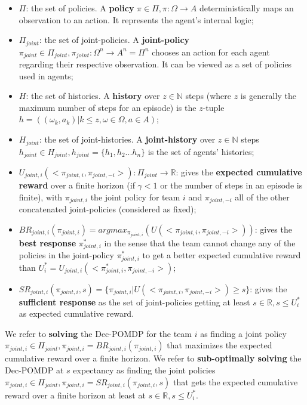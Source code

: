 \documentclass[sn-mathphys-num]{sn-jnl}%
\theoremstyle{thmstyleone}%
\theoremstyle{thmstyletwo}%
\theoremstyle{thmstylethree}%
\begin{document}
\begin{itemize}

    \item $\Pi$: the set of policies. A \textbf{policy} $\pi \in \Pi, \pi: \Omega \rightarrow A$ deterministically maps an observation to an action. It represents the agent's internal logic;
    \item $\Pi_{joint}$: the set of joint-policies. A \textbf{joint-policy} $\pi_{joint} \in \Pi_{joint}, \pi_{joint}: \Omega^n \rightarrow A^n = \Pi^n$ chooses an action for each agent regarding their respective observation. It can be viewed as a set of policies used in agents;
    \item $H$: the set of histories. A \textbf{history} over $z \in \mathbb{N}$ steps (where $z$ is generally the maximum number of steps for an episode) is the $z$-tuple $h = ((\omega_{k}, a_{k}) | k \leq z, \omega \in \Omega, a \in A)$;
    \item $H_{joint}$: the set of joint-histories. A \textbf{joint-history} over $z \in \mathbb{N}$ steps $h_{joint} \in H_{joint}, h_{joint} = \{h_1,h_2...h_n\}$ is the set of agents' histories;
    \item $U_{joint,i}(<\pi_{joint,i}, \pi_{joint,-i}>): \Pi_{joint} \rightarrow \mathbb{R}$: gives the \textbf{expected cumulative reward} over a finite horizon (if $\gamma < 1$ or the number of steps in an episode is finite), with $\pi_{joint,i}$ the joint policy for team $i$ and $\pi_{joint,-i}$ all of the other concatenated joint-policies (considered as fixed);
    \item $BR_{joint,i}(\pi_{joint,i}) = argmax_{\pi_{joint,i}}(U(<\pi_{joint,i},\pi_{joint,-i}>))$: gives the \textbf{best response} $\pi_{joint,i}^*$ in the sense that the team cannot change any of the policies in the joint-policy $\pi_{joint,i}^*$ to get a better expected cumulative reward than $U_i^* = U_{joint,i}(<\pi_{joint,i}^*, \pi_{joint,-i}>)$;
    \item $SR_{joint,i}(\pi_{joint,i}, s) = \{\pi_{joint,i} | U(<\pi_{joint,i},\pi_{joint,-i}>) \geq s\}$: gives the \textbf{sufficient response} as the set of joint-policies getting at least $s \in \mathbb{R}, s \leq U_i^*$ as expected cumulative reward.
\end{itemize}

We refer to \textbf{solving} the Dec-POMDP for the team $i$ as finding a joint policy $\pi_{joint,i} \in \Pi_{joint}, \pi_{joint,i} = BR_{joint,i}(\pi_{joint,i})$ that maximizes the expected cumulative reward over a finite horizon.
We refer to \textbf{sub-optimally solving} the Dec-POMDP at $s$ expectancy as finding the joint policies $\pi_{joint,i} \in \Pi_{joint}, \pi_{joint,i} = SR_{joint,i}(\pi_{joint,i}, s)$ that gets the expected cumulative reward over a finite horizon at least at $s \in \mathbb{R}, s \leq U_i^*$.
\end{document}
